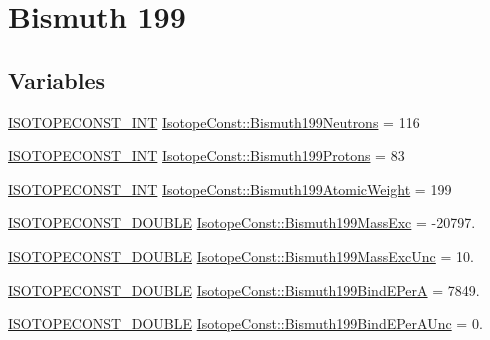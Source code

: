 \hypertarget{group___isotope_const-_bismuth-_bi199}{}\section{Bismuth 199}
\label{group___isotope_const-_bismuth-_bi199}
\subsection*{Variables}
\begin{DoxyCompactItemize}
\item 
\mbox{\hyperlink{group___isotope_const-_macros_ga5f18360b3e99483a35c32d789e62621c}{I\+S\+O\+T\+O\+P\+E\+C\+O\+N\+S\+T\+\_\+\+I\+NT}} \mbox{\hyperlink{group___isotope_const-_bismuth-_bi199_ga7b3fd4934a1c09dac909abbe0ae709d6}{Isotope\+Const\+::\+Bismuth199\+Neutrons}} = 116
\item 
\mbox{\hyperlink{group___isotope_const-_macros_ga5f18360b3e99483a35c32d789e62621c}{I\+S\+O\+T\+O\+P\+E\+C\+O\+N\+S\+T\+\_\+\+I\+NT}} \mbox{\hyperlink{group___isotope_const-_bismuth-_bi199_ga5321dd800b6f019127ef9cb250998f53}{Isotope\+Const\+::\+Bismuth199\+Protons}} = 83
\item 
\mbox{\hyperlink{group___isotope_const-_macros_ga5f18360b3e99483a35c32d789e62621c}{I\+S\+O\+T\+O\+P\+E\+C\+O\+N\+S\+T\+\_\+\+I\+NT}} \mbox{\hyperlink{group___isotope_const-_bismuth-_bi199_ga0daf20c99f0fac78eb34445c0148eec8}{Isotope\+Const\+::\+Bismuth199\+Atomic\+Weight}} = 199
\item 
\mbox{\hyperlink{group___isotope_const-_macros_ga8f45a7272ce02c0b4c65c44636ed719a}{I\+S\+O\+T\+O\+P\+E\+C\+O\+N\+S\+T\+\_\+\+D\+O\+U\+B\+LE}} \mbox{\hyperlink{group___isotope_const-_bismuth-_bi199_gaad6a415f7d7e3b9b8181095e58fe125f}{Isotope\+Const\+::\+Bismuth199\+Mass\+Exc}} = -\/20797.
\item 
\mbox{\hyperlink{group___isotope_const-_macros_ga8f45a7272ce02c0b4c65c44636ed719a}{I\+S\+O\+T\+O\+P\+E\+C\+O\+N\+S\+T\+\_\+\+D\+O\+U\+B\+LE}} \mbox{\hyperlink{group___isotope_const-_bismuth-_bi199_ga56da397acfa30025513d52b2169f485c}{Isotope\+Const\+::\+Bismuth199\+Mass\+Exc\+Unc}} = 10.
\item 
\mbox{\hyperlink{group___isotope_const-_macros_ga8f45a7272ce02c0b4c65c44636ed719a}{I\+S\+O\+T\+O\+P\+E\+C\+O\+N\+S\+T\+\_\+\+D\+O\+U\+B\+LE}} \mbox{\hyperlink{group___isotope_const-_bismuth-_bi199_ga30424cbb9148e3c63a3607a454914da0}{Isotope\+Const\+::\+Bismuth199\+Bind\+E\+PerA}} = 7849.
\item 
\mbox{\hyperlink{group___isotope_const-_macros_ga8f45a7272ce02c0b4c65c44636ed719a}{I\+S\+O\+T\+O\+P\+E\+C\+O\+N\+S\+T\+\_\+\+D\+O\+U\+B\+LE}} \mbox{\hyperlink{group___isotope_const-_bismuth-_bi199_ga16aa4b8067477f7f83cab6ff45bf6338}{Isotope\+Const\+::\+Bismuth199\+Bind\+E\+Per\+A\+Unc}} = 0.

\end{DoxyCompactItemize}
